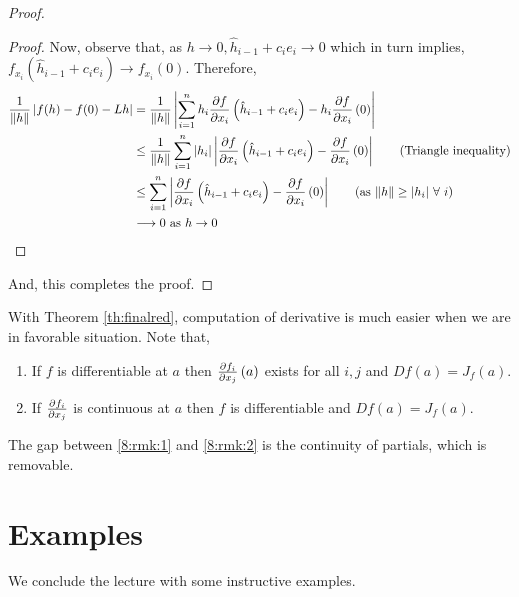 \documentclass[../Analysis-3]{subfiles}
\begin{document}
\begin{proof}
\begin{proof}
    Now, observe that, as $ h \to 0, \hat{h}_{i-1}+c_ie_i \to 0 $ which in turn implies, $ f_{x_i}( \hat{h}_{i-1}+c_ie_i ) \to f_{x_i}(0) $. Therefore,
    \begin{align*}
      \frac{1}{\norm{h}}\left| f(h)-f(0)-Lh \right|
       & = \frac{1}{\norm{h}}\left| \sum_{i=1}^{n} h_i\pdv{f}{x_i}\left( \hat{h}_{i-1} + c_ie_i \right) - h_i\pdv{f}{x_i}\left( 0 \right) \right|                                          \\
       & \leq \frac{1}{\norm{h}}\sum_{i=1}^{n} \left| h_i \right|\left| \pdv{f}{x_i}\left( \hat{h}_{i-1} + c_ie_i \right) - \pdv{f}{x_i}\left( 0 \right) \right| \tag{Triangle inequality} \\
       & \leq \sum_{i=1}^{n} \left| \pdv{f}{x_i}\left( \hat{h}_{i-1} + c_ie_i \right) - \pdv{f}{x_i}\left( 0 \right) \right|  \tag{as $\norm{h} \geq |h_i|\ \forall\ i$}                   \\
       & \longrightarrow 0 \text{ as } h \to 0
    \end{align*}
  \end{proof}
  And, this completes the proof.
\end{proof}

With Theorem \ref{th:finalred}, computation of derivative is much easier when we are in favorable situation. Note that,
\begin{enumerate}[label = (\roman*)]
  \item If $ f $ is differentiable at $ a $ then $ \pdv{f_i}{x_j}\left( a \right) $ exists for all $ i, j $ and $ Df(a) = J_{f}(a) $. \label{8:rmk:1}
  \item If $ \pdv{f_i}{x_j} $ is continuous at $ a $ then $ f $ is differentiable and $ Df(a) = J_{f}(a) $. \label{8:rmk:2}
\end{enumerate}
The gap between \ref{8:rmk:1} and \ref{8:rmk:2} is the continuity of partials, which is removable.


\section{Examples}
We conclude the lecture with some instructive examples.
\end{document}

